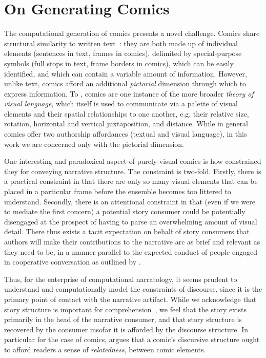 \section{On Generating Comics}

The computational generation of comics presents a novel challenge. Comics 
share structural similarity to written text~\cite{saraceni2016relatedness}: 
they are both made up of individual elements (sentences in text, frames in 
comics), delimited by special-purpose symbols (full stops in text, frame 
borders in comics), which can be easily identified, and which can contain a 
variable amount of information. However, unlike text, comics afford an additional \emph{pictorial} dimension through which to express information. To 
, comics are one instance of the more broader 
\emph{theory of visual language}, which itself is used to communicate via
a palette of visual elements and their spatial relationships to one another,
e.g. their relative size, rotation, horizontal and vertical juxtaposition, 
and distance. While in general comics offer two authorship affordances 
(textual and visual language), in this work we are concerned only with 
the pictorial dimension.

One interesting and paradoxical aspect of purely-visual comics is how
constrained they for conveying narrative structure. The constraint is 
two-fold. Firstly, there is a practical constraint in that there are 
only so many visual elements that can be placed in a particular frame
before the ensemble becomes too littered to understand. Secondly, there
is an attentional constraint in that (even if we were to mediate
the first concern) a potential story consumer could be potentially
disengaged at the prospect of having to parse an overwhelming amount of
visual detail. There thus exists a tacit expectation on behalf of story
consumers that authors will make their contributions to the narrative arc
as brief and relevant as they need to be, in a manner parallel to the
expected conduct of people engaged in cooperative conversation as outlined 
by .

Thus, for the enterprise of computational narratology, it seems prudent to
understand and computationally model the constraints of discourse, since 
it is the primary point of contact with the narrative artifact. While we 
acknowledge that story structure is important for 
comprehension~\cite{graesser2002how}, we feel that the story exists primarily
in the head of the narrative consumer, and that story structure is recovered 
by the consumer insofar it is afforded by the discourse structure. In particular
for the case of comics,  argues that a comic's
discursive structure ought to afford readers a sense of \emph{relatedness}, 
between comic elements.

